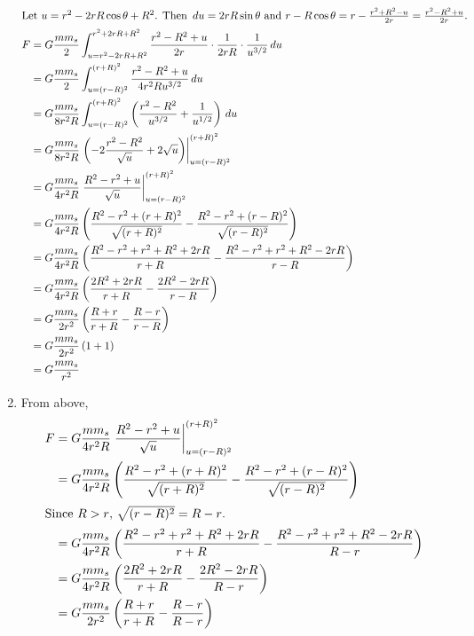 \documentclass{esg8012pset}
\renewcommand{\d}{\,d}
\begin{document}
\begin{solution}
\begin{enumerate}[1)]
\begin{align*}
    \intertext{Let $u=r^2-2rR\cos\theta + R^2$.  Then $\d u = 2rR\sin\theta$ and $r-R\cos\theta = r - \frac{r^2 + R^2 - u}{2r} = \frac{r^2 - R^2 + u}{2r}$.}
    F & = G \frac{m m_s}{2} \int_{u = r^2-2rR+R^2}^{r^2+2rR+R^2} \frac{r^2 - R^2 + u}{2r} \cdot \frac{1}{2rR} \cdot  \frac{1}{u^{3/2}} \d{u} \\
     & = G \frac{m m_s}{2} \int_{u = (r-R)^2}^{(r+R)^2} \frac{r^2 - R^2 + u}{4r^2Ru^{3/2}} \d{u} \\
     & = G \frac{m m_s}{8r^2R} \int_{u = (r-R)^2}^{(r+R)^2} \left(\frac{r^2 - R^2}{u^{3/2}} + \frac{1}{u^{1/2}}\right) \d{u} \\
     & = G \frac{m m_s}{8r^2R} \left.\left(-2\frac{r^2 - R^2}{\sqrt{u}} + 2\sqrt{u}\right)\right|_{u = (r-R)^2}^{(r+R)^2} \\
     & = G \frac{m m_s}{4r^2R} \left.\frac{R^2 - r^2 + u}{\sqrt{u}}\right|_{u = (r-R)^2}^{(r+R)^2} \\
     & = G \frac{m m_s}{4r^2R} \left(\frac{R^2 - r^2 + (r+R)^2}{\sqrt{(r+R)^2}} - \frac{R^2 - r^2 + (r-R)^2}{\sqrt{(r-R)^2}}\right) \\
     & = G \frac{m m_s}{4r^2R} \left(\frac{R^2 - r^2 + r^2 + R^2 + 2rR}{r+R} - \frac{R^2 - r^2 + r^2 + R^2 -2rR}{r-R}\right) \\
     & = G \frac{m m_s}{4r^2R} \left(\frac{2R^2 + 2rR}{r+R} - \frac{2R^2 - 2rR}{r-R}\right) \\
     & = G \frac{m m_s}{2r^2} \left(\frac{R + r}{r+R} - \frac{R - r}{r-R}\right) \\
     & = G \frac{m m_s}{2r^2} \left(1 + 1\right) \\
     & = G \frac{m m_s}{r^2}
    \end{align*}
    \item From above, \begin{align*}
     F & = G \frac{m m_s}{4r^2R} \left.\frac{R^2 - r^2 + u}{\sqrt{u}}\right|_{u = (r-R)^2}^{(r+R)^2} \\
     & = G \frac{m m_s}{4r^2R} \left(\frac{R^2 - r^2 + (r+R)^2}{\sqrt{(r+R)^2}} - \frac{R^2 - r^2 + (r-R)^2}{\sqrt{(r-R)^2}}\right) \\
     \intertext{Since $R>r$, $\sqrt{(r-R)^2} = R - r$.}
     & = G \frac{m m_s}{4r^2R} \left(\frac{R^2 - r^2 + r^2 + R^2 + 2rR}{r+R} - \frac{R^2 - r^2 + r^2 + R^2 -2rR}{R - r}\right) \\
     & = G \frac{m m_s}{4r^2R} \left(\frac{2R^2 + 2rR}{r+R} - \frac{2R^2 - 2rR}{R - r}\right) \\
     & = G \frac{m m_s}{2r^2} \left(\frac{R + r}{r+R} - \frac{R - r}{R - r}\right) \\

\end{align*}
\end{enumerate}
\end{solution}
\end{document}
